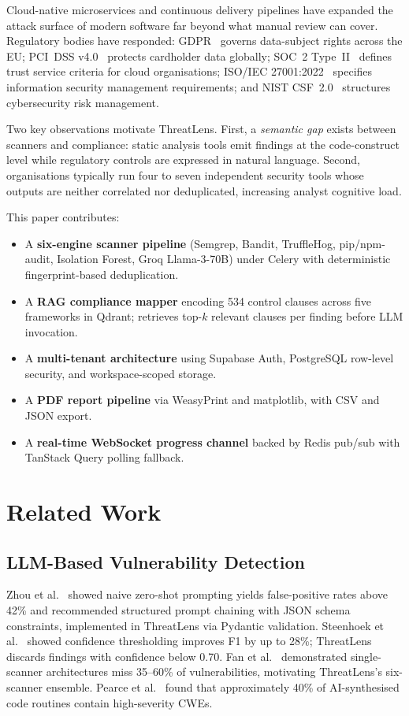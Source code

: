 \documentclass[conference]{IEEEtran}
\begin{document}
Cloud-native microservices and continuous delivery pipelines have expanded
the attack surface of modern software far beyond what manual review can
cover. Regulatory bodies have responded: GDPR~\cite{GDPR2016} governs
data-subject rights across the EU; PCI~DSS v4.0~\cite{PCIDSS4} protects
cardholder data globally; SOC~2 Type~II~\cite{SOC2} defines trust service
criteria for cloud organisations; ISO/IEC 27001:2022~\cite{ISO27001}
specifies information security management requirements; and NIST
CSF~2.0~\cite{NISTCSF2} structures cybersecurity risk management.

Two key observations motivate ThreatLens. First, a \emph{semantic gap}
exists between scanners and compliance: static analysis tools emit
findings at the code-construct level while regulatory controls are
expressed in natural language. Second, organisations typically run four
to seven independent security tools whose outputs are neither correlated
nor deduplicated, increasing analyst cognitive load.

This paper contributes:
\begin{itemize}
  \item A \textbf{six-engine scanner pipeline} (Semgrep, Bandit,
    TruffleHog, pip/npm-audit, Isolation Forest, Groq Llama-3-70B) under
    Celery with deterministic fingerprint-based deduplication.
  \item A \textbf{RAG compliance mapper} encoding 534 control clauses
    across five frameworks in Qdrant; retrieves top-$k$ relevant clauses
    per finding before LLM invocation.
  \item A \textbf{multi-tenant architecture} using Supabase Auth,
    PostgreSQL row-level security, and workspace-scoped storage.
  \item A \textbf{PDF report pipeline} via WeasyPrint and matplotlib,
    with CSV and JSON export.
  \item A \textbf{real-time WebSocket progress channel} backed by Redis
    pub/sub with TanStack Query polling fallback.
\end{itemize}

\section{Related Work}
\label{sec:related}

\subsection{LLM-Based Vulnerability Detection}
Zhou et al.~\cite{zhou2024llmvuln} showed naive zero-shot prompting yields
false-positive rates above 42\% and recommended structured prompt chaining
with JSON schema constraints, implemented in ThreatLens via Pydantic
validation. Steenhoek et al.~\cite{steenhoek2024finetune} showed
confidence thresholding improves F1 by up to 28\%; ThreatLens discards
findings with confidence below 0.70. Fan et al.~\cite{fan2025dlvuln}
demonstrated single-scanner architectures miss 35--60\% of vulnerabilities,
motivating ThreatLens's six-scanner ensemble. Pearce et
al.~\cite{pearce2022asleep} found that approximately 40\% of AI-synthesised
code routines contain high-severity CWEs.
\end{document}

